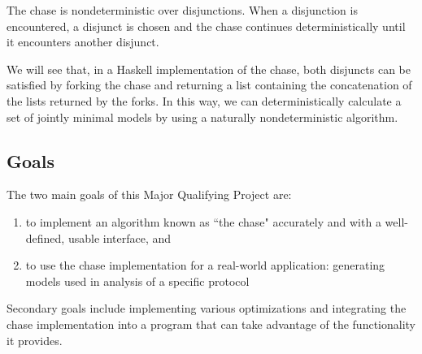 		The chase is nondeterministic over disjunctions. When a disjunction is
		encountered, a disjunct is chosen and the chase continues
		deterministically until it encounters another disjunct.

		We will see that, in a Haskell implementation of the chase, both
		disjuncts can be satisfied by forking the chase and returning a list
		containing the concatenation of the lists returned by the forks. In
		this way, we can deterministically calculate a set of jointly minimal
		models by using a naturally nondeterministic algorithm.

	\subsection{Goals}

		The two main goals of this Major Qualifying Project are:

		\begin{enumerate}
		\item to implement an algorithm known as ``the chase" accurately
		and with a well-defined, usable interface, and
		\item to use the chase implementation for a real-world
		application: generating models used in analysis of a specific protocol
		\end{enumerate}

		Secondary goals include implementing various optimizations and
		integrating the chase implementation into a program that can take
		advantage of the functionality it provides.
